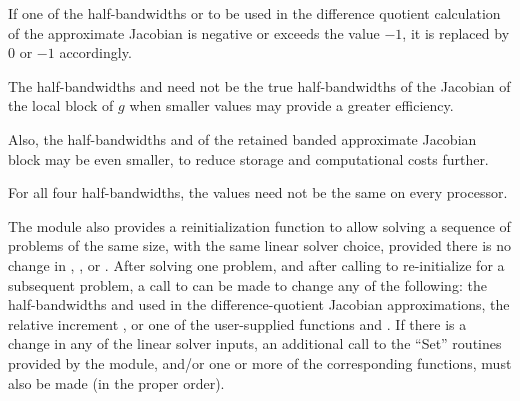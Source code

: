 {
  If one of the half-bandwidths  or  to be used in the
  difference quotient calculation of the approximate Jacobian is negative or
  exceeds the value $-1$, it is replaced by 0 or
  $-1$ accordingly.

  The half-bandwidths  and  need not be the true
  half-bandwidths of the Jacobian of the local block of $g$
  when smaller values may provide a greater efficiency.

  Also, the half-bandwidths  and  of the retained
  banded approximate Jacobian block may be even smaller,
  to reduce storage and computational costs further.

  For all four half-bandwidths, the values need not be the
  same on every processor.
}


The {\cvbbdpre} module also provides a reinitialization function to allow
solving a sequence of problems of the same size, with the same linear solver
choice, provided there is no change in , , or .
After solving one problem, and after calling  to
re-initialize {\cvode} for a subsequent problem, a call to 
can be made to change any of the following: the half-bandwidths  and
 used in the difference-quotient Jacobian approximations, the relative
increment , or one of the user-supplied functions  and .
If there is a change in any of the linear solver inputs, an additional call
to the ``Set'' routines provided by the {\sunlinsol} module, and/or
one or more of the corresponding  functions, must
also be made (in the proper order).

